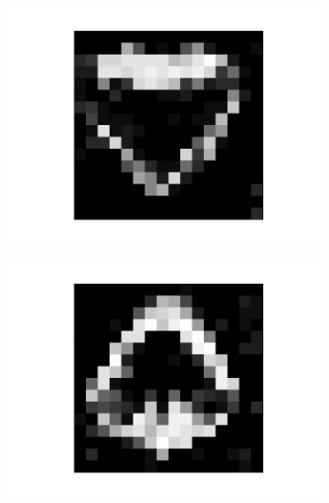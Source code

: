 \begin{figure}[h!]
\begin{subfigure}{.25\textwidth}
  		\label{fig:sub1}
	\end{subfigure}%
	\begin{subfigure}{.25\textwidth}
  		\centering
  		\includegraphics[width=.8\linewidth]{imgs/poker/recon_img1.png}
  		\label{fig:sub1}
	\end{subfigure}%
	\begin{subfigure}{.25\textwidth}
  		\centering
  		\includegraphics[width=.8\linewidth]{imgs/poker/recon_img7.png}
  		\label{fig:sub1}
	\end{subfigure}%
	

\end{figure}
